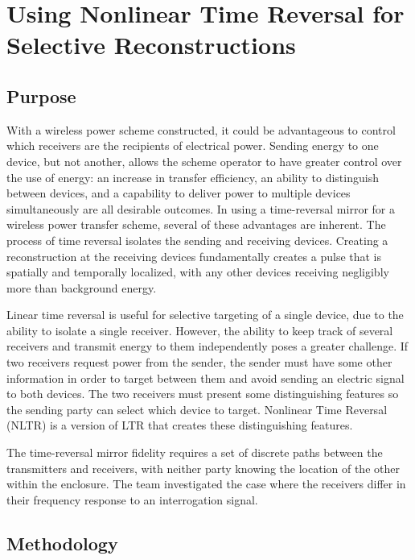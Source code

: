 \chapter{Using Nonlinear Time Reversal for Selective Reconstructions}
\label{ch:selective}

\section{Purpose}
\label{sec:selective-purpose}

With a wireless power scheme constructed, it could be advantageous to control which receivers are the recipients of electrical power. Sending energy to one device, but not another, allows the scheme operator to have greater control over the use of energy: an increase in transfer efficiency, an ability to distinguish between devices, and a capability to deliver power to multiple devices simultaneously are all desirable outcomes. In using a time-reversal mirror for a wireless power transfer scheme, several of these advantages are inherent. The process of time reversal isolates the sending and receiving devices. Creating a reconstruction at the receiving devices fundamentally creates a pulse that is spatially and temporally localized, with any other devices receiving negligibly more than background energy.

Linear time reversal is useful for selective targeting of a single device, due to the ability to isolate a single receiver. However, the ability to keep track of several receivers and transmit energy to them independently poses a greater challenge. If two receivers request power from the sender, the sender must have some other information in order to target between them and avoid sending an electric signal to both devices. The two receivers must present some distinguishing features so the sending party can select which device to target. Nonlinear Time Reversal (NLTR) is a version of LTR that creates these distinguishing features.

The time-reversal mirror fidelity requires a set of discrete paths between the transmitters and receivers, with neither party knowing the location of the other within the enclosure. The team investigated the case where the receivers differ in their frequency response to an interrogation signal.

\section{Methodology}
\label{sec:selective-meth}

